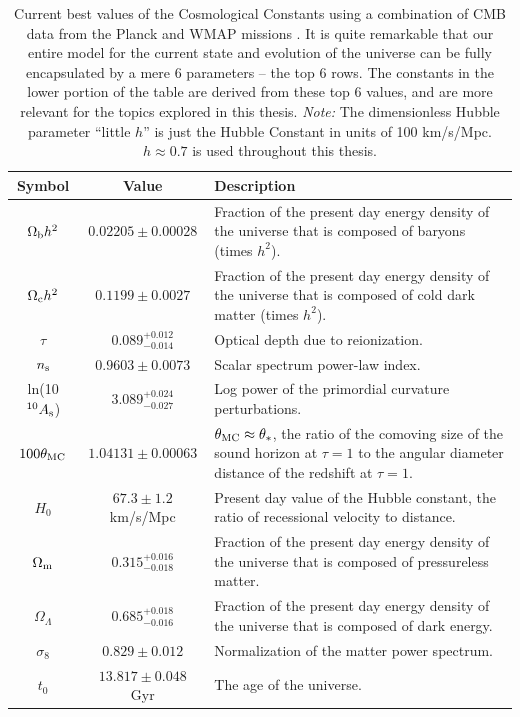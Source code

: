 \begin{table}%
 \begin{center}
    \begin{tabular}{|c|c|p{10cm}|}

      \hline
      Symbol & Value & Description \\ \hline \hline

      $\Omega_{\rm b}h^2$ & $0.02205\pm0.00028$ & Fraction of the present day energy density of the universe that is composed of baryons (times $h^2$). \\ \hline
      $\Omega_{\rm c}h^2$ & $0.1199\pm0.0027$ & Fraction of the present day energy density of the universe that is composed of cold dark matter (times $h^2$). \\ \hline
      $\tau$ & $0.089^{+0.012}_{-0.014}$ & Optical depth due to reionization. \\ \hline
      $n_{\rm s}$ & $0.9603\pm0.0073$ & Scalar spectrum power-law index. \\ \hline
      ln(10$^{10}A_{\rm s}$) & $3.089^{+0.024}_{-0.027}$ & Log power of the primordial curvature perturbations. \\ \hline 
      $100\theta_{\rm MC}$ & $1.04131\pm0.00063$ & $\theta_{\rm MC} \approx \theta_*$, the ratio of the comoving size of the sound horizon at $\tau=1$ to the angular diameter distance of the redshift at $\tau=1$. \\ \hline \hline

      $H_0$ & $67.3\pm1.2$ km/s/Mpc & Present day value of the Hubble constant, the ratio of recessional velocity to distance. \\ \hline
      $\Omega_{\rm m}$ & $0.315^{+0.016}_{-0.018}$ & Fraction of the present day energy density of the universe that is composed of pressureless matter. \\ \hline
      $\Omega_{\Lambda}$ & $0.685^{+0.018}_{-0.016}$ & Fraction of the present day energy density of the universe that is composed of dark energy. \\ \hline
      $\sigma_8$ & $0.829\pm0.012$ & Normalization of the matter power spectrum. \\ \hline
      $t_0$ & $13.817\pm0.048$ Gyr & The age of the universe. \\ \hline

    \end{tabular}
  \caption[Cosmological Constants]{Current best values of the Cosmological Constants using a combination of \ac{CMB} data from the \acs{Planck} and \ac{WMAP} missions \citep{PlanckXVI}. It is quite remarkable that our entire model for the current state and evolution of the universe can be fully encapsulated by a mere 6 parameters -- the top 6 rows. The constants in the lower portion of the table are derived from these top 6 values, and are more relevant for the topics explored in this thesis. {\it Note: }The dimensionless Hubble parameter ``little $h$'' is just the Hubble Constant in units of 100 km/s/Mpc. $h \approx 0.7$ is used throughout this thesis.}
  \label{table:constants}

 \end{center}
\end{table}


